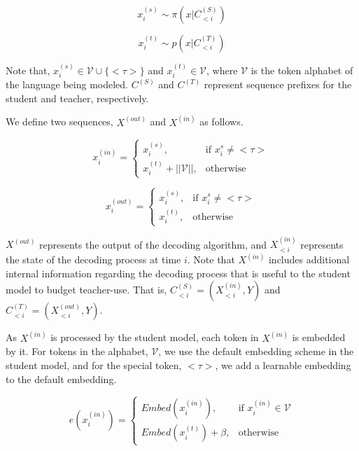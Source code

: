 \begin{equation}
x_{i}^{(s)} \sim \pi(x|C^{(S)}_{<i}) \label{eq:stud_decode}
\end{equation}

\begin{equation}
x_{i}^{(t)} \sim p(x|C^{(T)}_{<i}) \label{eq:teacher_decode}
\end{equation}

Note that, $x_{i}^{(s)} \in \mathcal{V} \cup \{<\tau>\}$ and $x_{i}^{(t)} \in \mathcal{V}$, where $\mathcal{V}$ is the token alphabet of the language being modeled. $C^{(S)}$ and $C^{(T)}$ represent sequence prefixes for the student and teacher, respectively.

We define two sequences, $X^{(out)}$ and $X^{(in)}$ as follows.

\begin{equation}
    x^{(in)}_i =
    \begin{cases}
    x_i^{(s)}, &\text{if } x^{s}_i \neq <\tau> \\
    x_i^{(t)} + ||\mathcal{V}||, &\text{otherwise}
    \end{cases} \label{eq:X_in}
\end{equation}

\begin{equation}
    x^{(out)}_i =
    \begin{cases}
    x_i^{(s)}, &\text{if } x^{s}_i \neq <\tau> \\
    x_i^{(t)}, &\text{otherwise}
    \end{cases} \label{eq:X_out}
\end{equation}

$X^{(out)}$ represents the output of the decoding algorithm, and $X^{(in)}_{<i}$ represents the state of the decoding process at time $i$. Note that $X^{(in)}$ includes additional internal information regarding the decoding process that is useful to the student model to budget teacher-use.  That is, $C^{(S)}_{<i} = (X^{(in)}_{<i}, Y)$ and $C^{(T)}_{<i} = (X^{(out)}_{<i}, Y)$. 

As $X^{(in)}$ is processed by the student model, each token in $X^{(in)}$ is embedded by it. For tokens in the alphabet, $\mathcal{V}$, we use the default embedding scheme in the student model, and for the special token, $<\tau>$, we add a learnable embedding to the default embedding.

\begin{equation}
    e(x^{(in)}_i) = \begin{cases}
        Embed(x^{(in)}_i),&\text{if } x^{(in)}_i \in \mathcal{V} \\
        Embed(x^{(t)}_i) + \beta,&\text{otherwise}
    \end{cases} \label{eq:embedding}
\end{equation}

